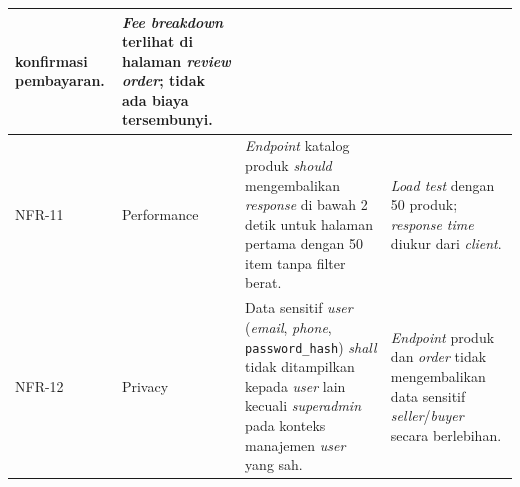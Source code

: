 \begin{longtable}{|L{1cm}|L{2.5cm}|L{6.5cm}|L{4.5cm}|}
          konfirmasi pembayaran.
        & \textit{Fee breakdown} terlihat di halaman \textit{review order};
          tidak ada biaya tersembunyi. \\
    \hline
    NFR-11
        & Performance
        & \textit{Endpoint} katalog produk \textit{should} mengembalikan
          \textit{response} di bawah 2 detik untuk halaman pertama dengan 50 item
          tanpa filter berat.
        & \textit{Load test} dengan 50 produk; \textit{response time} diukur dari
          \textit{client}. \\
    \hline
    NFR-12
        & Privacy
        & Data sensitif \textit{user} (\textit{email}, \textit{phone},
          \texttt{password\_hash}) \textit{shall} tidak ditampilkan kepada
          \textit{user} lain kecuali \textit{superadmin} pada konteks manajemen
          \textit{user} yang sah.
        & \textit{Endpoint} produk dan \textit{order} tidak mengembalikan data
          sensitif \textit{seller}/\textit{buyer} secara berlebihan. \\
    \hline
\end{longtable}
